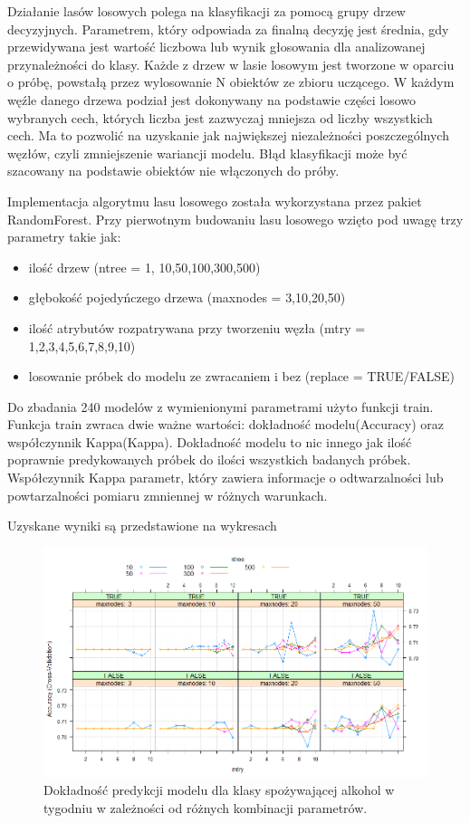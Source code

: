 Działanie lasów losowych polega na klasyfikacji za pomocą grupy drzew decyzyjnych. Parametrem, który odpowiada za finalną decyzję jest średnia, gdy przewidywana jest wartość liczbowa lub wynik głosowania dla analizowanej przynależności do klasy. Każde z drzew w lasie losowym jest tworzone w oparciu o próbę, powstałą przez wylosowanie N obiektów ze zbioru uczącego. W każdym węźle danego drzewa podział jest dokonywany na podstawie części losowo wybranych cech, których liczba jest zazwyczaj mniejsza od liczby wszystkich cech. Ma to pozwolić na uzyskanie jak największej niezależności poszczególnych węzłów, czyli zmniejszenie wariancji modelu.
Błąd klasyfikacji może być szacowany na podstawie obiektów nie włączonych do próby.

Implementacja algorytmu lasu losowego została wykorzystana przez pakiet RandomForest. Przy pierwotnym budowaniu lasu losowego wzięto pod uwagę trzy parametry takie jak:
\begin{itemize}
    \item ilość drzew (ntree = {1, 10,50,100,300,500})
    \item głębokość pojedyńczego drzewa (maxnodes = {3,10,20,50})
    \item ilość atrybutów rozpatrywana przy tworzeniu węzła (mtry = {1,2,3,4,5,6,7,8,9,10})
    \item losowanie próbek do modelu ze zwracaniem i bez (replace = {TRUE/FALSE})
\end{itemize}
Do zbadania 240 modelów z wymienionymi parametrami użyto funkcji train. 
Funkcja train zwraca dwie ważne wartości: dokładność modelu(Accuracy) oraz współczynnik Kappa(Kappa). Dokładność modelu to nic innego jak ilość poprawnie predykowanych próbek do ilości wszystkich badanych próbek. Współczynnik Kappa parametr, który zawiera informacje o odtwarzalności lub powtarzalności pomiaru zmniennej w różnych warunkach. 

Uzyskane wyniki są przedstawione na wykresach

\begin{figure}[h]
 \centering 
 \includegraphics[scale=0.60]{tex/customD_vol4.png}
 \caption{Dokładność predykcji modelu dla klasy spożywającej alkohol w tygodniu w zależności od różnych kombinacji parametrów.}
 \label{fig:classes}
\end{figure}

